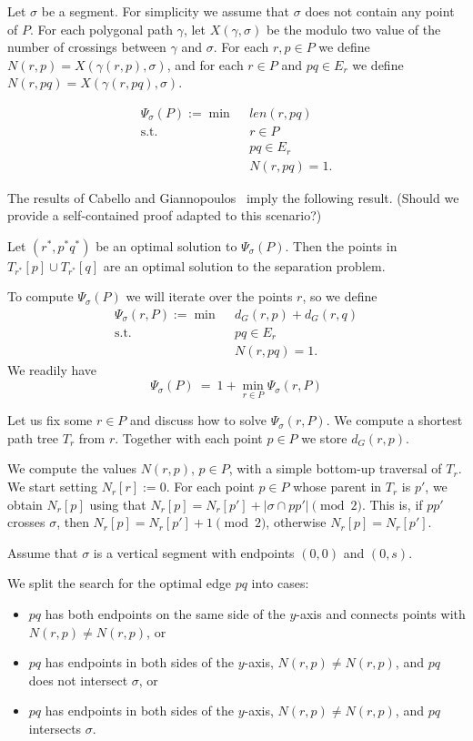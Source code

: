\documentclass[a4paper,USenglish,numberwithinsect]{lipics}
\def\curve{\gamma}
\def\length{\mathit{len}}
\begin{document}
\begin{appendix}
Let $\sigma$ be a segment. For simplicity we assume that $\sigma$ does not
contain any point of $P$. For each polygonal path $\gamma$, let $X(\gamma,\sigma)$ be the
modulo two value of the number of crossings between $\gamma$ and $\sigma$.
For each $r,p\in P$ we define $N(r,p)=X(\curve(r,p),\sigma)$, and 
for each $r\in P$ and $pq\in E_r$ we define $N(r,pq)=X(\curve(r,pq),\sigma)$.

\begin{align*}
	\Psi_\sigma(P) := \min ~~& \length(r,pq)\\
	 \mbox{s.t.}~~ & r\in P\\
				&	pq\in E_r\\
				&	N(r,pq)=1. 
\end{align*}

The results of Cabello and Giannopoulos~\cite{aa} imply the following result.
(Should we provide a self-contained proof adapted to this scenario?)

\begin{theorem}
	Let $(r^*,p^*q^*)$ be an optimal solution to $\Psi_\sigma(P)$.
	Then the points in $T_{r^*}[p]\cup T_{r^*}[q]$ are an optimal solution
	to the separation problem.
\end{theorem}

To compute $\Psi_\sigma(P)$ we will iterate over the points $r$, so we define
\begin{align*}
	\Psi_\sigma(r,P) := \min ~~& d_G(r,p)+d_G(r,q) \\
	 \mbox{s.t.}~~ & pq\in E_r\\
				&	N(r,pq)=1. 
\end{align*}
We readily have
\[
	\Psi_\sigma(P) ~=~ 1+ \min_{r\in P} \Psi_\sigma(r,P)
\]

Let us fix some $r\in P$ and discuss how to solve $\Psi_\sigma(r,P)$. 
We compute a shortest path tree $T_r$ from $r$. Together with each
point $p\in P$ we store $d_G(r,p)$.

We compute the values $N(r,p)$, $p\in P$, with a simple bottom-up traversal of $T_r$.
We start setting $N_r[r]:=0$. For each point $p\in P$ whose parent in $T_r$ is $p'$,
we obtain $N_r[p]$ using that $N_r[p]=N_r[p']+ |\sigma\cap pp'| \pmod 2$.
This is, if $pp'$ crosses $\sigma$, then $N_r[p]=N_r[p']+1 \pmod 2$, otherwise
$N_r[p]=N_r[p']$.

Assume that $\sigma$ is a vertical segment with endpoints $(0,0)$ and $(0,s)$.

We split the search for the optimal edge $pq$ into cases: 
\begin{itemize}
	\item $pq$ has both endpoints on the same side of the $y$-axis and 
		connects points with $N(r,p)\neq N(r,p)$, or
	\item $pq$ has endpoints in both sides of the $y$-axis, $N(r,p)\neq N(r,p)$,
		and $pq$ does not intersect $\sigma$, or
	\item $pq$ has endpoints in both sides of the $y$-axis, $N(r,p)\neq N(r,p)$,
		and $pq$ intersects $\sigma$.
\end{itemize}



\end{appendix}
\end{document}
